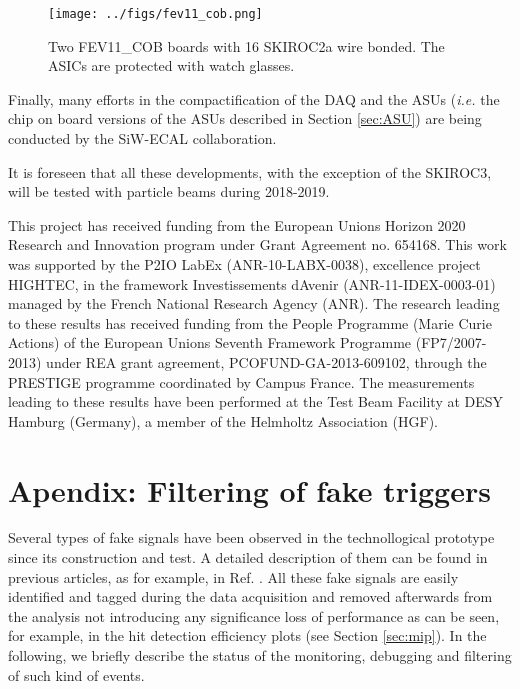 \documentclass[a4paper,11pt]{article}
\begin{document}
\begin{figure}[!t]
  \centering
    \texttt{[image: ../figs/fev11\_cob.png]} 
  \caption{Two FEV11\_COB boards with 16 SKIROC2a wire bonded. The ASICs are protected with watch glasses.}
\label{cob}
\end{figure}

Finally, many efforts in the compactification of
the DAQ and the ASUs ({\it i.e.} the chip on board versions of the 
ASUs described in Section \ref{sec:ASU}) are being
conducted by the SiW-ECAL collaboration.

It is foreseen that all these developments, with the exception of the SKIROC3, will be tested with particle beams during 2018-2019.


\acknowledgments

This project has received funding from the European Union{\textquotesingle}s Horizon 2020 Research and Innovation program under Grant Agreement no. 654168.
This work was supported by the P2IO LabEx (ANR-10-LABX-0038), excellence project HIGHTEC,
in the framework {\textquotesingle}Investissements d{\textquotesingle}Avenir{\textquotesingle}
(ANR-11-IDEX-0003-01) managed by the French National Research Agency (ANR).
The research leading to these results has received funding from the People Programme (Marie
Curie Actions) of the European Union{\textquotesingle}s Seventh Framework Programme (FP7/2007-2013)
under REA grant agreement, PCOFUND-GA-2013-609102, through the PRESTIGE
programme coordinated by Campus France.
The measurements leading to these results have been performed at the Test Beam Facility at DESY Hamburg (Germany), a member of the Helmholtz Association (HGF).

\appendix
\section{Apendix: Filtering of fake triggers}
\label{sec:retriggers}

Several types of fake signals have been observed in the technollogical prototype since its construction and test. A detailed description of them
can be found in previous articles, as for example, in Ref. \cite{Amjad:2014tha}. All these fake signals are easily identified
and tagged during the data acquisition and removed afterwards from the analysis
not introducing any significance loss of performance as can be seen, for example, in the hit detection efficiency plots (see Section \ref{sec:mip}).
In the following, we briefly describe the status of the monitoring, debugging and filtering
of such kind of events.
\end{document}
